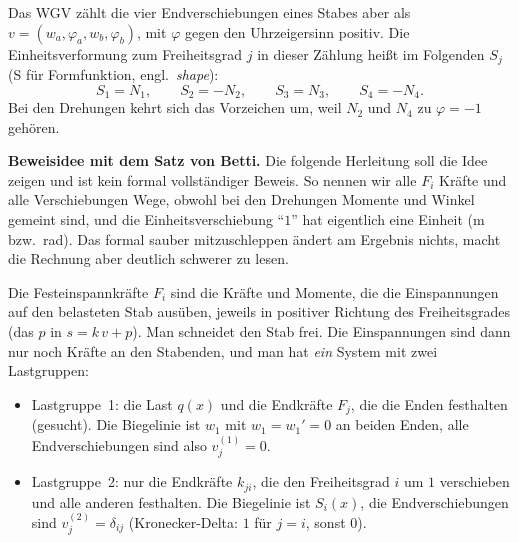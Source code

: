 Das WGV zählt die vier Endverschiebungen eines Stabes aber als $v = (w_a, \varphi_a, w_b, \varphi_b)$,
mit $\varphi$ gegen den Uhrzeigersinn positiv. Die Einheitsverformung zum Freiheitsgrad $j$ in
dieser Zählung heißt im Folgenden $S_j$ (S für Formfunktion, engl.\ \emph{shape}):
\[
  S_1 = N_1, \qquad S_2 = -N_2, \qquad S_3 = N_3, \qquad S_4 = -N_4 .
\]
Bei den Drehungen kehrt sich das Vorzeichen um, weil $N_2$ und $N_4$ zu $\varphi = -1$ gehören.

\textbf{Beweisidee mit dem Satz von Betti.} Die folgende Herleitung soll die Idee zeigen und
ist kein formal vollständiger Beweis. So nennen wir alle $F_i$ Kräfte und alle Verschiebungen Wege,
obwohl bei den Drehungen Momente und Winkel gemeint sind, und die Einheitsverschiebung \enquote{$1$}
hat eigentlich eine Einheit (m bzw.\ rad). Das formal sauber mitzuschleppen ändert am Ergebnis
nichts, macht die Rechnung aber deutlich schwerer zu lesen.

Die Festeinspannkräfte $F_i$ sind die Kräfte und
Momente, die die Einspannungen auf den belasteten Stab ausüben, jeweils in positiver Richtung des
Freiheitsgrades (das $p$ in $s = k\,v + p$). Man schneidet den Stab frei. Die Einspannungen sind
dann nur noch Kräfte an den Stabenden, und man hat \emph{ein} System mit zwei Lastgruppen:

\begin{itemize}
  \item Lastgruppe~1: die Last $q(x)$ und die Endkräfte $F_j$, die die Enden festhalten (gesucht).
        Die Biegelinie ist $w_1$ mit $w_1 = w_1' = 0$ an beiden Enden, alle Endverschiebungen sind
        also $v_j^{(1)} = 0$.
  \item Lastgruppe~2: nur die Endkräfte $k_{ji}$, die den Freiheitsgrad $i$ um $1$ verschieben und
        alle anderen festhalten. Die Biegelinie ist $S_i(x)$, die Endverschiebungen sind
        $v_j^{(2)} = \delta_{ij}$ (Kronecker-Delta: $1$ für $j = i$, sonst $0$).
\end{itemize}

